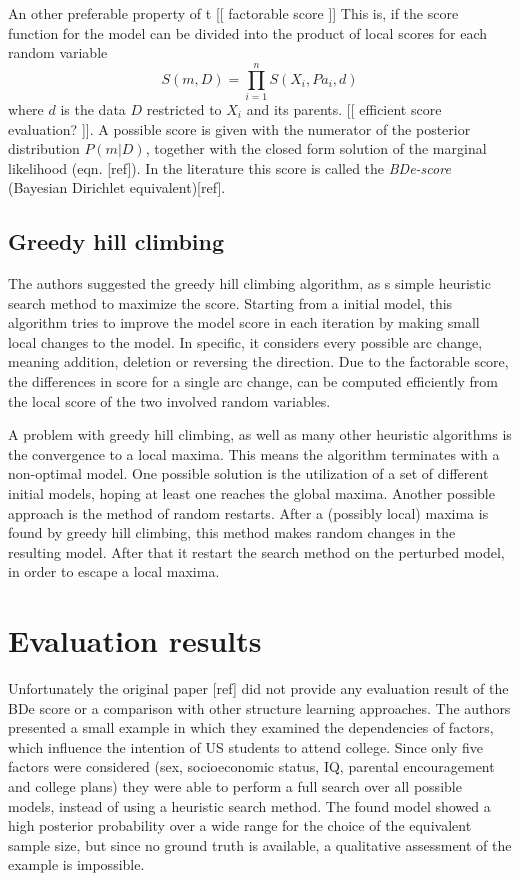\documentclass{article}
\begin{document}
	An other preferable property of t [[ factorable score ]]
	This is, if the score function for the model can be divided into the product of local scores for each
	random variable
	\[
		S(m,D) = \prod_{i=1}^n S(X_i, Pa_i, d)
	\]
	where $d$ is the data $D$ restricted to $X_i$ and its parents. [[ efficient score evaluation? ]].
	A possible score is given with the numerator of the posterior distribution $P(m|D)$, together with
	the closed form solution of the marginal likelihood (eqn. [ref]). In the literature this score
	is called the \textit{BDe-score} (Bayesian Dirichlet equivalent)[ref].
	
	\subsection{Greedy hill climbing}
	The authors suggested the greedy hill climbing algorithm, as s simple heuristic
	search method to maximize the score. Starting from a initial model, this algorithm
	tries to improve the model score in each iteration by making small local changes to
	the model. In specific, it considers every possible arc change, meaning addition, deletion
	or reversing the direction. Due to the factorable score, the differences in score for a single
	arc change, can be computed efficiently from the local score of the two involved random variables.
	
	A problem with greedy hill climbing, as well as many other heuristic algorithms is the convergence
	to a local maxima. This means the algorithm terminates with a non-optimal model. One possible
	solution is the utilization of a set of different initial models, hoping at least one reaches
	the global maxima. Another possible approach is the method of random restarts. After a (possibly local)
  maxima is found by greedy hill climbing, this method makes random changes in the resulting model.
  After that it restart the search method on the perturbed model, in order to escape a local maxima.
	
\section{Evaluation results}
Unfortunately the original paper [ref] did not provide any evaluation result of the BDe score or a
comparison with other structure learning approaches. The authors presented a small example
in which they examined the dependencies of factors, which influence the intention of
US students to attend college. Since only five factors were considered (sex, socioeconomic status,
IQ, parental encouragement and college plans) they were able to perform a full search over
all possible models, instead of using a heuristic search method. The found model showed a
high posterior probability over a wide range for the choice of the equivalent sample size,
but since no ground truth is available, a qualitative assessment of the example is impossible.
\end{document}
